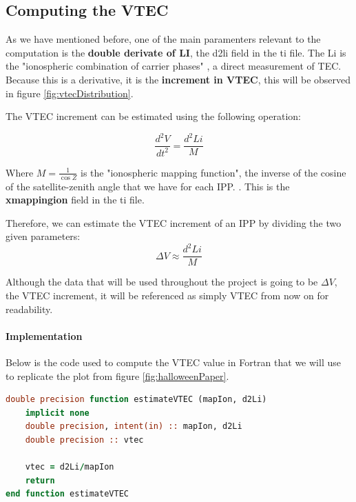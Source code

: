 \subsection{Computing the VTEC}

As we have mentioned before, one of the main paramenters relevant to the computation is the \textbf{double derivate of LI}, the d2li field in the ti file. The Li is the "ionospheric combination of carrier phases" \cite{hernandez2012gnss}, a direct measurement of TEC. Because this is a derivative, it is the \textbf{increment in VTEC}, this will be observed in figure \ref{fig:vtecDistribution}.

The VTEC increment can be estimated using the following operation:

\begin{equation} \label{eq:1}
	\frac{d^{2}V}{dt^{2}} = \frac{d^{2}Li}{M}
\end{equation}

Where $M=\frac{1}{\cos Z}$ is the "ionospheric mapping function", the inverse of the cosine of the satellite-zenith angle that we have for each IPP. \cite{hernandez2012gnss}. This is the \textbf{xmappingion} field in the ti file.

Therefore, we can estimate the VTEC increment of an IPP by dividing the two given parameters:
\begin{equation} \label{eq:2}
	\Delta V \approx \frac{d^{2}Li}{M}
\end{equation}

Although the data that will be used throughout the project is going to be $\Delta V$, the VTEC increment, it will be referenced as simply VTEC from now on for readability.

\paragraph{Implementation}

Below is the code used to compute the VTEC value in Fortran that we will use to replicate the plot from figure \ref{fig:halloweenPaper}.

\begin{minipage}{\linewidth}
\begin{lstlisting}[language=Fortran, caption=Simple Fortran function to compute the VTEC value]
double precision function estimateVTEC (mapIon, d2Li)
	implicit none
	double precision, intent(in) :: mapIon, d2Li
	double precision :: vtec
	
	vtec = d2Li/mapIon
	return
end function estimateVTEC
\end{lstlisting}
\end{minipage}

